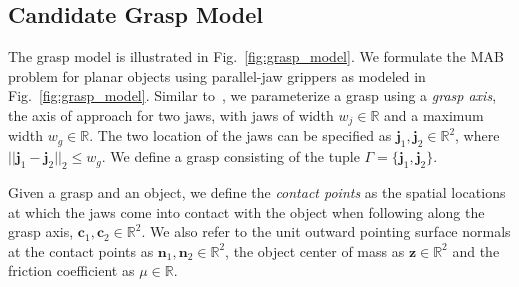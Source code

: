 \documentclass[10pt, conference]{ieeeconf}      %
\newcommand{\bc}{\mathbf{c}}
\newcommand{\bn}{\mathbf{n}}
\newcommand{\bz}{\mathbf{z}}
\begin{document}
\subsection{Candidate Grasp Model}
The grasp model is illustrated in Fig.~\ref{fig:grasp_model}. We formulate the MAB problem for planar objects using parallel-jaw grippers as modeled in Fig.~\ref{fig:grasp_model}. Similar to~\cite{mahler2015gp}, we parameterize a grasp using a {\it grasp axis}, the axis of approach for two jaws,  with jaws of width $w_j \in \mathbb{R}$ and a maximum width $w_g \in \mathbb{R}$. The two location of the jaws can be specified as $\mathbf{j}_1,\mathbf{j}_2 \in \mathbb{R}^2$, where $||\mathbf{j}_1 - \mathbf{j}_2||_2 \leq w_g$. We define a grasp consisting of the tuple $\Gamma = \lbrace \mathbf{j}_1, \mathbf{j}_2 \rbrace$. 


Given a grasp and an object, we define the {\it contact points} as the spatial locations at which the jaws come into contact with the object when following along the grasp axis, $\bc_1, \bc_2 \in \mathbb{R}^2$.
We also refer to the unit outward pointing surface normals at the contact points as $\bn_1, \bn_2 \in \mathbb{R}^2$, the object center of mass as $\bz \in \mathbb{R}^2$ and the friction coefficient as $\mu \in \mathbb{R}$.

\end{document}
